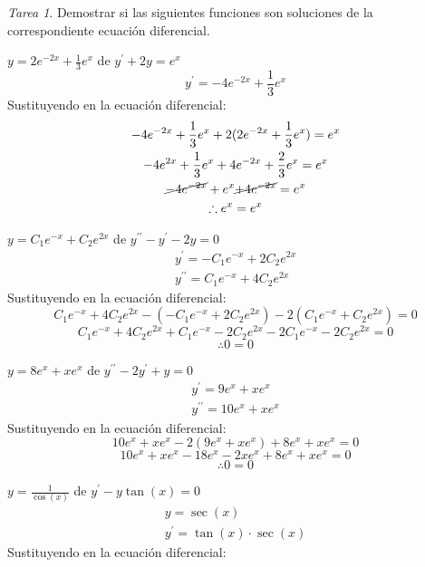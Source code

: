 \documentclass[12pt]{article} %
\theoremstyle{remark} %
\newtheorem{tarea}{Tarea}[section] %
\newcounter{ejercicio}[tarea]
\newcommand{\ed}{ecuación diferencial}
\begin{document}
\begin{tarea}\label{tarea:soluciones}
  Demostrar si las siguientes funciones son soluciones de la correspondiente ecuación diferencial.
  
  \begin{ejercicio}[2]
  $y = 2e^{-2x} + \frac{1}{3} e^x$ de $y^{\prime} + 2y = e^x$
    \[ y^{\prime} = -4e^{-2x} + \frac{1}{3} e^x \]
    Sustituyendo en la \ed:
    \begin{gather*}
      -4e^{-2x} + \frac{1}{3} e^x + 2(2e^{-2x} + \frac{1}{3} e^x) = e^x\\
      -4e^{2x} + \frac{1}{3} e^x + 4e^{-2x} + \frac{2}{3} e^x = e^x\\
      \cancel{-4e^{-2x}} + e^x \cancel{+ 4e^{-2x}} = e^x\\
      \therefore e^x = e^x
    \end{gather*}
  \end{ejercicio}
  \begin{ejercicio}[4]
    $y = C_1 e^{-x} + C_2 e^{2x}$ de $y^{\prime \prime} - y^{\prime} -2y = 0$
    \begin{gather*}
      y^{\prime} = -C_1 e^{-x} + 2C_2e^{2x}\\[0.5em]
      y^{\prime \prime} = C_1e^{-x} + 4C_2e^{2x}
    \end{gather*}
    Sustituyendo en la \ed :
    \[ C_1e^{-x} + 4C_2e^{2x} - (-C_1e^{-x} + 2C_2e^{2x}) - 2(C_1e^{-x} + C_2e^{2x}) = 0 \]
    \[ C_1e^{-x} + 4C_2e^{2x} + C_1e^{-x} - 2C_2e^{2x} - 2C_1e^{-x} -2C_2e^{2x} = 0 \]
    \[ \therefore 0 = 0 \]
  \end{ejercicio}
  \begin{ejercicio}[5]
    $y = 8e^x + xe^x$ de $y^{\prime \prime} - 2y^{\prime} + y = 0$
    \begin{gather*}
      y^{\prime} = 9e^x + xe^x\\[0.5em]
      y^{\prime \prime} = 10e^x + xe^x
    \end{gather*}
    Sustituyendo en la \ed :
    \[ 10e^x + xe^x - 2(9e^x + xe^x) + 8e^x + xe^x = 0 \]
    \[ 10e^x + xe^x - 18e^x - 2xe^x + 8e^x + xe^x = 0 \]
    \[ \therefore 0 = 0 \]
  \end{ejercicio}
  \begin{ejercicio}[7]
    $y = \frac{1}{\cos(x)}$ de $y^{\prime} - y \tan(x) = 0$
    \begin{gather*}
      y = \sec(x)\\
      y^{\prime} = \tan(x) \cdot \sec(x)
    \end{gather*}
    Sustituyendo en la \ed :

\end{ejercicio}
\end{tarea}
\end{document}
